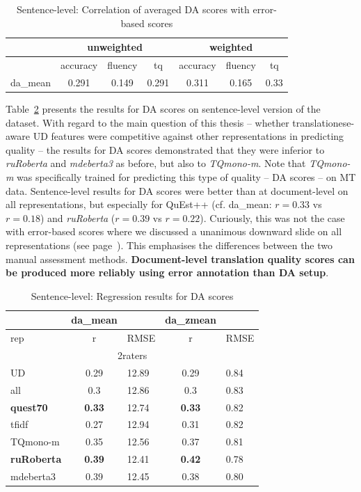 \begin{table}[H]
	\centering
	\begin{tabular}{l|ccc|ccc}
		\toprule
		& \multicolumn{3}{c|}{unweighted} & \multicolumn{3}{c}{weighted} \\
		\midrule
		& accuracy   & fluency & tq    & accuracy & fluency & tq    \\
		\midrule
		da\_mean & 0.291 & 0.149 & 0.291 & 0.311 & 0.165 & 0.33 \\
		\bottomrule
	\end{tabular}
	\caption{\label{tab:sent_err-da_corr}Sentence-level: Correlation of averaged DA scores with error-based scores}
\end{table}

Table~\ref{tab:da_sent_res} presents the results for DA scores on sentence-level version of the dataset. 
With regard to the main question of this thesis -- whether translationese-aware UD features were competitive against other representations in predicting quality -- the results for DA scores demonstrated that they were inferior to \textit{ruRoberta} and \textit{mdeberta3} as before, but also to \textit{TQmono-m}. Note that \textit{TQmono-m} was specifically trained for predicting this type of quality -- DA scores -- on MT data. 
\label{pg:no_slide_for_da_when_moving_to_sent}
Sentence-level results for DA scores were better than at document-level on all representations, but especially for QuEst++ (cf. da\_mean: $r=0.33$ vs $r=0.18$) and \textit{ruRoberta} ($r=0.39$ vs $r=0.22$). Curiously, this was not the case with error-based scores where we discussed a unanimous downward slide on all representations (see page~\pageref{pg:downward_slide}). 
This emphasises the differences between the two manual assessment methods. \textbf{Document-level translation quality scores can be produced more reliably using error annotation than DA setup}. 
\begin{table}[H]
	\centering
	\begin{tabular}{l|cl|cl}
		\toprule
		& da\_mean &      & da\_zmean &      \\
		\midrule
		rep             & r         & RMSE & r          & RMSE \\
		\midrule
		\multicolumn{5}{c}{2raters}     \\ 
		\midrule
		UD              & 0.29 & 12.89 & 0.29 & 0.84 \\
		all             & 0.3  & 12.86 & 0.3  & 0.83 \\
		\textbf{quest70}         & \textbf{0.33} & 12.74 & \textbf{0.33} & 0.82 \\
		\midrule
		tfidf           & 0.27 & 12.94 & 0.31 & 0.82 \\
		\midrule
		TQmono-m        & 0.35 & 12.56 & 0.37 & 0.81 \\
		\textbf{ruRoberta} & \textbf{0.39} & 12.41 & \boxit{0.4in}\textbf{0.42} & 0.78 \\
		mdeberta3  & 0.39 & 12.45 & 0.38 & 0.80 \\
		\bottomrule
	\end{tabular}
	\caption{\label{tab:da_sent_res}Sentence-level: Regression results for DA scores}
\end{table}




